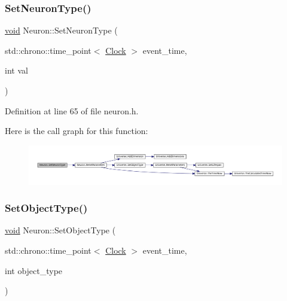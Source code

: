 \subsubsection{\texorpdfstring{Set\+Neuron\+Type()}{SetNeuronType()}}
{\footnotesize\ttfamily \mbox{\hyperlink{glad_8h_a950fc91edb4504f62f1c577bf4727c29}{void}} Neuron\+::\+Set\+Neuron\+Type (\begin{DoxyParamCaption}\item[{std\+::chrono\+::time\+\_\+point$<$ \mbox{\hyperlink{universe_8h_a0ef8d951d1ca5ab3cfaf7ab4c7a6fd80}{Clock}} $>$}]{event\+\_\+time,  }\item[{int}]{val }\end{DoxyParamCaption})\hspace{0.3cm}{\ttfamily [inline]}}



Definition at line 65 of file neuron.\+h.

Here is the call graph for this function\+:\nopagebreak
\begin{figure}[H]
\begin{center}
\leavevmode
\includegraphics[width=350pt]{class_neuron_afc685a0444425fceab6685a6ee004b65_cgraph}
\end{center}
\end{figure}
\mbox{\label{class_neuron_ab371e2dacf2cdde8db5547b72fb45ca1}} 
\subsubsection{\texorpdfstring{Set\+Object\+Type()}{SetObjectType()}}
{\footnotesize\ttfamily \mbox{\hyperlink{glad_8h_a950fc91edb4504f62f1c577bf4727c29}{void}} Neuron\+::\+Set\+Object\+Type (\begin{DoxyParamCaption}\item[{std\+::chrono\+::time\+\_\+point$<$ \mbox{\hyperlink{universe_8h_a0ef8d951d1ca5ab3cfaf7ab4c7a6fd80}{Clock}} $>$}]{event\+\_\+time,  }\item[{int}]{object\+\_\+type }\end{DoxyParamCaption})}



